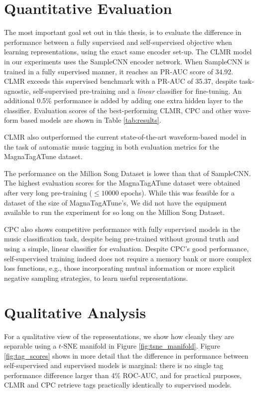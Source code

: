 \section{Quantitative Evaluation}
The most important goal set out in this thesis, is to evaluate the difference in performance between a fully supervised and self-supervised objective when learning representations, using the exact same encoder set-up. The CLMR model in our experiments uses the SampleCNN encoder network. When SampleCNN is trained in a fully supervised manner, it reaches an PR-AUC score of 34.92. CLMR exceeds this supervised benchmark with a PR-AUC of 35.37, despite task-agnostic, self-supervised pre-training and a \textit{linear} classifier for fine-tuning. An additional 0.5\% performance is added by adding one extra hidden layer to the classifier. Evaluation scores of the best-performing CLMR, CPC and other wave-form based models are shown in Table \ref{tab:results}.

CLMR also outperformed the current state-of-the-art waveform-based model in the task of automatic music tagging \cite{pons_end--end_2017} in both evaluation metrics for the MagnaTagATune dataset.

The performance on the Million Song Dataset is lower than that of SampleCNN. The highest evaluation scores for the MagnaTagATune dataset were obtained after very long pre-training ($\leq 10000$ epochs). While this was feasible for a dataset of the size of MagnaTagATune's, We did not have the equipment available to run the experiment for so long on the Million Song Dataset.

CPC also shows competitive performance with fully supervised models in the music classification task, despite being pre-trained without ground truth and using a simple, linear classifier for evaluation.
Despite CPC's good performance, self-supervised training indeed does not require a memory bank or more complex loss functions, e.g., those incorporating mutual information or more explicit negative sampling strategies, to learn useful representations.


\section{Qualitative Analysis}
For a qualitative view of the representations, we show how cleanly they are  separable using a $t$-SNE manifold in Figure \ref{fig:tsne_manifold}.
Figure \ref{fig:tag_scores} shows in more detail that the difference in performance between self-supervised and supervised models is marginal: there is no single tag performance difference larger than 4\% ROC-AUC, and for practical purposes, CLMR and CPC retrieve tags practically identically to supervised models.

